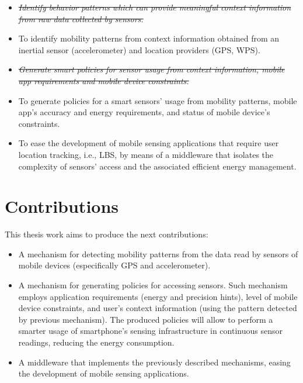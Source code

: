 \documentclass{report}
\begin{document}
\begin{itemize}
  \item \emph{\sout{Identify behavior patterns which can provide meaningful context information from raw data collected by sensors.}}
  \item To identify mobility patterns from context information obtained from an inertial sensor (accelerometer) and location providers (GPS, WPS).
  \item \emph{\sout{Generate smart policies for sensor usage from context information, mobile app requirements and mobile device constraints.}}
  \item To generate policies for a smart sensors' usage from mobility patterns, mobile app's accuracy and energy requirements, and status of mobile device's constraints. 
  \item {\color{blue} To ease the development of mobile sensing applications that require user location tracking, i.e., LBS, by means of a middleware that isolates the complexity of sensors' access and the associated efficient energy management.}
\end{itemize}


\section{Contributions}
This thesis work aims to produce the next contributions:
\begin{itemize}
  \item A mechanism for detecting mobility patterns from the data read by sensors of mobile devices (especifically GPS and accelerometer).
  \item A mechanism for generating policies for accessing sensors.
  Such mechanism employs application requirements (energy and precision hints), level of mobile device constraints, and user's context information (using the pattern detected by previous mechanism).
  The produced policies will allow to perform a smarter usage of smartphone's sensing infrastructure in continuous sensor readings, reducing the energy consumption.
  \item A middleware that implements the previously described mechanisms, easing the development of mobile sensing applications.
\end{itemize}





\end{document}
